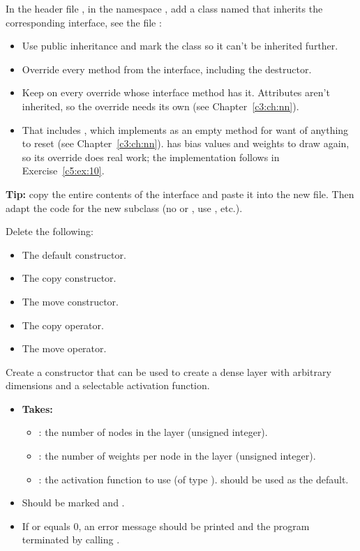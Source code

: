 \label{c5:ex:4}
In the header file , in the namespace
, add a class named  that inherits the corresponding interface,
see the file :
\begin{itemize}
  \item Use public inheritance and mark the class  so it can't be inherited further.
  \item Override every method from the interface, including the destructor.
  \item Keep \code{[[nodiscard]]} on every override whose interface method has it. Attributes
    aren't inherited, so the override needs its own (see Chapter~\ref{c3:ch:nn}).
  \item That includes , which  implements as an empty method for want
    of anything to reset (see Chapter~\ref{c3:ch:nn}).  has bias values and weights to
    draw again, so its override does real work; the implementation follows in
    Exercise~\ref{c5:ex:10}.
\end{itemize}
\textbf{Tip:} copy the entire contents of the interface and paste it into the new file. Then adapt
the code for the new subclass  (no  or , use ,
etc.).

\label{c5:ex:5}
Delete the following:
\begin{itemize}
  \item The default constructor.
  \item The copy constructor.
  \item The move constructor.
  \item The copy operator.
  \item The move operator.
\end{itemize}

\label{c5:ex:6}
Create a constructor that can be used to create a dense layer with arbitrary dimensions and a
selectable activation function.
\begin{itemize}
  \item \textbf{Takes:}
  \begin{itemize}
    \item {}: the number of nodes in the layer (unsigned integer).
    \item {}: the number of weights per node in the layer (unsigned integer).
    \item {}: the activation function to use (of type ).
       should be used as the default.
  \end{itemize}
  \item Should be marked  and .
  \item If  or  equals 0, an error message should be printed and
    the program terminated by calling .
\end{itemize}


